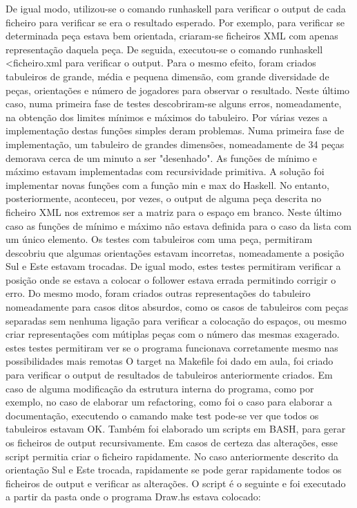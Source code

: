  De igual modo,  utilizou-se o comando runhaskell para  verificar o output de cada ficheiro  para verificar se
era o resultado  esperado. Por exemplo, para  verificar se determinada peça estava  bem orientada, criaram-se
ficheiros  XML  com  apenas representação  daquela  peça.  De  seguida,  executou-se o  comando  runhaskell
<ficheiro.xml para  verificar o  output. Para o  mesmo efeito,  foram criados tabuleiros  de grande,  média e
pequena dimensão,  com grande diversidade  de peças,  orientações e número  de jogadores para  observar o
resultado. Neste  último caso,  numa primeira fase  de testes descobriram-se  alguns erros,  nomeadamente, na
obtenção dos limites mínimos e máximos do  tabuleiro. Por várias vezes a implementação destas funções
simples  deram  problemas.  Numa  primeira  fase  de implementação,  um  tabuleiro  de  grandes  dimensões,
nomeadamente de 34  peças demorava cerca de  um minuto a ser  "desenhado". As funções de  mínimo e máximo
estavam implementadas com recursividade primitiva. A solução  foi implementar novas funções com a função
min e max do Haskell.  No entanto, posteriormente, aconteceu, por vezes, o output  de alguma peça descrita no
ficheiro XML nos extremos ser a matriz para o espaço  em branco. Neste último caso as funções de mínimo e
máximo não estava  definida para o caso  da lista com um único  elemento. Os testes com  tabuleiros com uma
peça, permitiram descobriu que algumas orientações estavam  incorretas, nomeadamente a posição Sul e Este
estavam trocadas.  De igual modo,  estes testes permitiram  verificar a posição onde  se estava a  colocar o
follower estava  errada permitindo corrigir o  erro. Do mesmo  modo, foram criados outras  representações do
tabuleiro nomeadamente para casos ditos absurdos, como os casos de tabuleiros com peças separadas sem nenhuma
ligação para verificar a colocação do espaços, ou mesmo criar representações com mútiplas peças com o
número das  mesmas exagerado. estes  testes permitiram  ver se o  programa funcionava corretamente  mesmo nas
possibilidades mais  remotas O target  na Makefile foi  dado em  aula, foi criado  para verificar o  output de
resultados  de tabuleiros  anteriormente criados.  Em caso  de alguma  modificação da  estrutura interna  do
programa,  como  por  exemplo,  no  caso  de  elaborar  um refactoring,  como  foi  o  caso  para  elaborar  a
documentação, executendo  o camando make test  pode-se ver que todos  os tabuleiros estavam OK.  Também foi
elaborado um  scripts em  BASH, para  gerar os  ficheiros de output  recursivamente. Em  casos de  certeza das
alterações,  esse  script  permitia  criar  o  ficheiro  rapidamente.  No  caso  anteriormente  descrito  da
orientação  Sul e  Este trocada,  rapidamente  se pode  gerar rapidamente  todos  os ficheiros  de output  e
verificar as alterações.  O script é o seguinte e  foi executado a partir da pasta  onde o programa Draw.hs
estava colocado:


